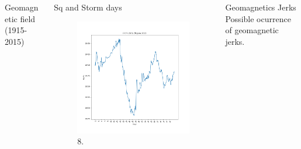 \documentclass[final,t]{beamer}
\begin{document}
\begin{columns}[t]
\begin{column}{.66\linewidth}
\begin{columns}
\begin{column}{.31\linewidth}
\begin{block}{Geomagnetic field (1915-2015)}
\end{block}	


\end{column}
\begin{column}{.31\linewidth}


\begin{block}{Sq and Storm days}
	\justifying
\begin{figure}
	\centering
	\includegraphics[width=0.6\linewidth]{28_29_june(2013)}
	\caption{8.}
	\label{storm}
\end{figure}	
	
\end{block}	
	

\end{column}


\begin{column}{.31\linewidth}
	
	
	\begin{block}{Geomagnetics Jerks}
		\justifying
		Possible ocurrence of geomagnetic jerks.
		

\end{block}
\end{column}
\end{columns}
\end{column}
\end{columns}
\end{document}

